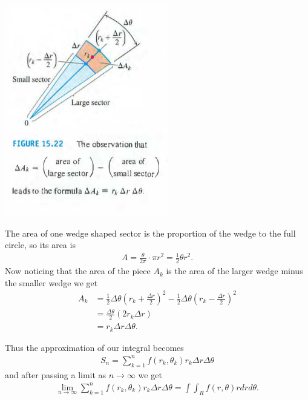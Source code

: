 \documentclass[12pt, letter]{article}
\theoremstyle{plain}
\numberwithin{theorem}{section}
\theoremstyle{definition}
\begin{document}
\bigskip

\begin{center}
\includegraphics[scale=0.7]{m3_f13}
\end{center}

\bigskip

The area of one wedge shaped sector is the proportion of the wedge to the full circle, so its area is
\begin{align*}
A = \frac{\theta}{2\pi} \cdot \pi r^2 = \frac{1}{2} \theta r^2.
\end{align*}
Now noticing that the area of the piece $A_k$ is the area of the larger wedge minus the smaller wedge we get
\begin{align*}
A_k &= \frac{1}{2} \Delta \theta \left(r_k+\frac{\Delta r}{2}\right)^2 - \frac{1}{2} \Delta \theta \left(r_k-\frac{\Delta r}{2}\right)^2\\
&= \frac{\Delta \theta}{2} (2r_k \Delta r)\\
&= r_k \Delta r \Delta \theta.
\end{align*}

\bigskip

Thus the approximation of our integral becomes 
\begin{align*}
S_n = \sum_{k=1}^n f(r_k,\theta_k) r_k \Delta r \Delta \theta
\end{align*}
and after passing a limit as $n\to\infty$ we get
\begin{align*}
\lim_{n\to\infty} \sum_{k=1}^n f(r_k,\theta_k) r_k \Delta r \Delta \theta = \int \int_R f(r,\theta) r dr d\theta.
\end{align*}

\newpage
\end{document}
